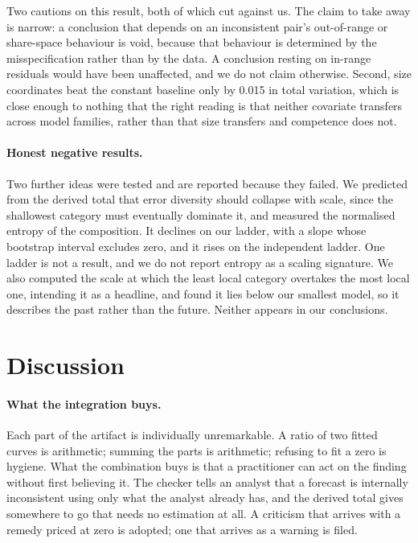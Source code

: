\documentclass[11pt]{article}
\begin{document}
Two cautions on this result, both of which cut against us. The claim to take away is
narrow: a conclusion that depends on an inconsistent pair's out-of-range or
share-space behaviour is void, because that behaviour is determined by the
misspecification rather than by the data. A conclusion resting on in-range residuals
would have been unaffected, and we do not claim otherwise. Second, size coordinates
beat the constant baseline only by 0.015 in total variation, which
is close enough to nothing that the right reading is that neither covariate transfers
across model families, rather than that size transfers and competence does not.

\paragraph{Honest negative results.}
Two further ideas were tested and are reported because they failed. We predicted
from the derived total that error diversity should collapse with scale, since the
shallowest category must eventually dominate it, and measured the normalised entropy of
the composition. It declines on our ladder, with a slope whose bootstrap interval
excludes zero, and it rises on the independent ladder. One ladder is not a result,
and we do not report entropy as a scaling signature. We also computed the scale at
which the least local category overtakes the most local one, intending it as a
headline, and found it lies below our smallest model, so it describes the past
rather than the future. Neither appears in our conclusions.

\section{Discussion}
\label{sec:discussion}

\paragraph{What the integration buys.}
Each part of the artifact is individually unremarkable. A ratio of two fitted curves
is arithmetic; summing the parts is arithmetic; refusing to fit a zero is hygiene. What the
combination buys is that a practitioner can act on the finding without first
believing it. The checker tells an analyst that a forecast is internally
inconsistent using only what the analyst already has, and the derived total gives
somewhere to go that needs no estimation at all. A criticism that arrives with a
remedy priced at zero is adopted; one that arrives as a warning is filed.
\end{document}

